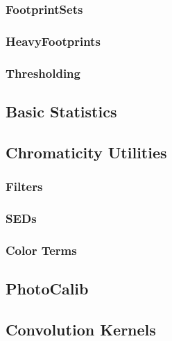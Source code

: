 \subsubsection{FootprintSets}
\label{sec:spFootprintsSets}

\subsubsection{HeavyFootprints}
\label{sec:spFootprintsHeavy}

\subsubsection{Thresholding}
\label{sec:spFootprintsThresholding}

\subsection{Basic Statistics}
\label{sec:spStatistics}

\subsection{Chromaticity Utilities}
\label{sec:spChromaticity}

\subsubsection{Filters}
\label{sec:spChromaticityFilters}

\subsubsection{SEDs}
\label{sec:spChromaticitySEDs}

\subsubsection{Color Terms}
\label{sec:spColorTerms}

\subsection{PhotoCalib}
\label{sec:spPhotoCalib}

\subsection{Convolution Kernels}
\label{sec:spKernels}

